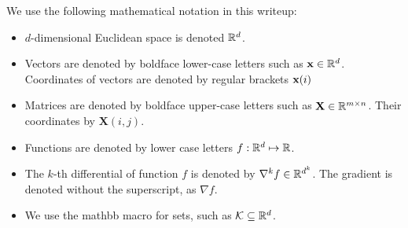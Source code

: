 \documentclass[11pt]{article}
\theoremstyle{definition}
\theoremstyle{definition}
\begin{document}
We use the following mathematical notation in this writeup:
\begin{itemize}
\item
$d$-dimensional  Euclidean space is denoted ${\mathbb R}^d$. 
\item
Vectors are denoted by boldface lower-case letters such as $\mathbf x \in {\mathbb R}^d$.  Coordinates of vectors are denoted by regular brackets $\mathbf x(i)$ 
\item
Matrices are denoted by boldface upper-case letters such as $\mathbf{X}  \in {\mathbb R}^{m \times n}$.  Their coordinates by $\mathbf{X}(i,j)$. 
\item
Functions are denoted by lower case letters $f: {\mathbb R}^d \mapsto {\mathbb R}$. 

\item 
The $k$-th differential of function $f$ is denoted by $\nabla^k f \in {\mathbb R}^{d^k}$.  The gradient is denoted without the superscript, as $\nabla f$. 

\item
We use the mathbb macro for sets, such as $\mathcal K \subseteq {\mathbb R}^d$.  

\end{itemize}



\end{document}

